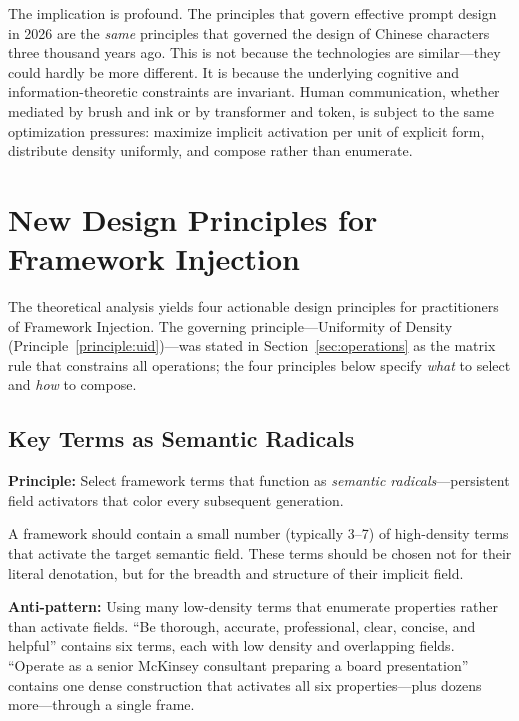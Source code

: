 \documentclass[12pt,a4paper]{article}
\begin{document}
The implication is profound.
The principles that govern effective prompt design in 2026 are the \textit{same} principles that governed the design of Chinese characters three thousand years ago.
This is not because the technologies are similar---they could hardly be more different.
It is because the underlying cognitive and information-theoretic constraints are invariant.
Human communication, whether mediated by brush and ink or by transformer and token, is subject to the same optimization pressures: maximize implicit activation per unit of explicit form, distribute density uniformly, and compose rather than enumerate.


\section{New Design Principles for Framework Injection}
\label{sec:design}

The theoretical analysis yields four actionable design principles for practitioners of Framework Injection.
The governing principle---Uniformity of Density (Principle~\ref{principle:uid})---was stated in Section~\ref{sec:operations} as the matrix rule that constrains all operations; the four principles below specify \textit{what} to select and \textit{how} to compose.

\subsection{Key Terms as Semantic Radicals}
\label{subsec:radicals-design}

\textbf{Principle:} Select framework terms that function as \textit{semantic radicals}---persistent field activators that color every subsequent generation.

A framework should contain a small number (typically 3--7) of high-density terms that activate the target semantic field.
These terms should be chosen not for their literal denotation, but for the breadth and structure of their implicit field.

\textbf{Anti-pattern:} Using many low-density terms that enumerate properties rather than activate fields.
``Be thorough, accurate, professional, clear, concise, and helpful'' contains six terms, each with low density and overlapping fields.
``Operate as a senior McKinsey consultant preparing a board presentation'' contains one dense construction that activates all six properties---plus dozens more---through a single frame.
\end{document}

